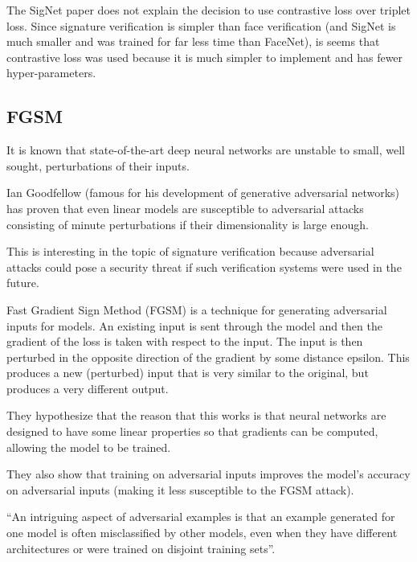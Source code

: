 The SigNet paper does not explain the decision to use contrastive loss over triplet loss.
Since signature verification is simpler than face verification (and SigNet is much smaller and was trained for far less time than FaceNet), is seems that contrastive loss was used because it is much simpler to implement and has fewer hyper-parameters\cite{sig_net}\cite{face_net}.


\subsection{FGSM}\label{sec:fgsm}

It is known that state-of-the-art deep neural networks are unstable to small, well sought, perturbations of their inputs\cite{deep_fool}.

Ian Goodfellow (famous for his development of generative adversarial networks) has proven that even linear models are susceptible to adversarial attacks consisting of minute perturbations if their dimensionality is large enough\cite{goodfellow}.

This is interesting in the topic of signature verification because adversarial attacks could pose a security threat if such verification systems were used in the future.

Fast Gradient Sign Method (FGSM) is a technique for generating adversarial inputs for models\cite{goodfellow}.
An existing input is sent through the model and then the gradient of the loss is taken with respect to the input.
The input is then perturbed in the opposite direction of the gradient by some distance epsilon.
This produces a new (perturbed) input that is very similar to the original, but produces a very different output.

They hypothesize that the reason that this works is that neural networks are designed to have some linear properties so that gradients can be computed, allowing the model to be trained\cite{goodfellow}. 

They also show that training on adversarial inputs improves the model's accuracy on adversarial inputs (making it less susceptible to the FGSM attack).

``An intriguing aspect of adversarial examples is that an example generated for one model is often
misclassified by other models, even when they have different architectures or were trained on disjoint training sets''\cite{goodfellow}.

